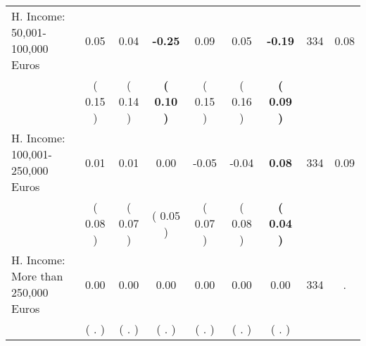 \begin{tabular}{lcccccccc}
H. Income: 50,001-100,000 Euros &      0.05 &      0.04 & \textbf{    -0.25} &      0.09 &      0.05 & \textbf{    -0.19} & 334 &       0.08 \\ 
 & (     0.15 ) & (     0.14 ) & \textbf{(     0.10 )} & (     0.15 ) & (     0.16 ) & \textbf{(     0.09 )} & \\
H. Income: 100,001-250,000 Euros &      0.01 &      0.01 &      0.00 &     -0.05 &     -0.04 & \textbf{     0.08} & 334 &       0.09 \\ 
 & (     0.08 ) & (     0.07 ) & (     0.05 ) & (     0.07 ) & (     0.08 ) & \textbf{(     0.04 )} & \\
H. Income: More than 250,000 Euros &      0.00 &      0.00 &      0.00 &      0.00 &      0.00 &      0.00 & 334 &          . \\ 
 & (        . ) & (        . ) & (        . ) & (        . ) & (        . ) & (        . ) & \\
\bottomrule
\end{tabular}
